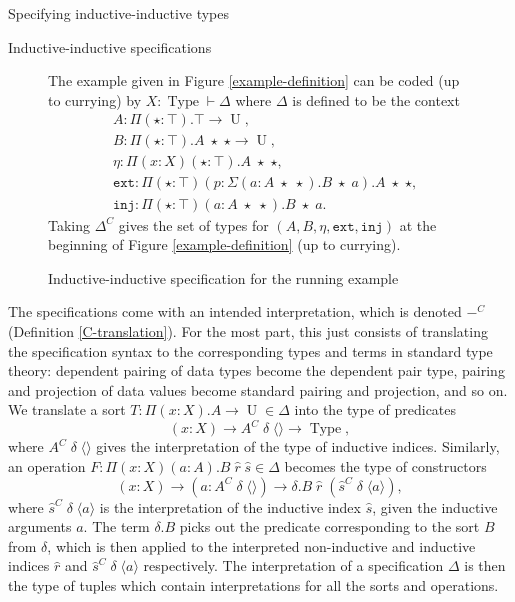 \documentclass[runningheads]{llncs}
\DeclareMathOperator{\USet}{Type}
\DeclareMathOperator{\UU}{U}
\newcommand{\tac}{\vdash}
\newcommand{\join}{\texttt{ext}}
\newcommand{\inj}{\texttt{inj}}
\def\emptytuple{\langle\rangle}
\begin{document}
{\begin{section}{Specifying inductive-inductive types}
\begin{subsection}{Inductive-inductive specifications}
\begin{figure}[htpb]\begin{flushleft}
    The example given in Figure \ref{example-definition} can be coded (up to currying) by $X : \USet \tac \Delta$ where $\Delta$ is defined to be the context \begin{align*}& A : \Pi(\star : \top).\top \to \UU,\\& B : \Pi(\star : \top).A\;\star\;\star \to \UU,\\& \eta : \Pi(x : X)(\star : \top).A\;\star\;\star, \\&\join : \Pi(\star : \top)(p : \Sigma(a : A\;\star\;\star).B\;\star\;a).A\;\star\;\star,\\& \inj : \Pi(\star : \top)(a : A\;\star\;\star).B\;\star\;a.\end{align*}
    Taking $\Delta^C$ gives the set of types for $(A, B, \eta, \join, \inj)$ at the beginning of Figure \ref{example-definition} (up to currying).
    
    \caption{\label{example-code}Inductive-inductive specification for the running example}
\end{flushleft}\end{figure}

The specifications come with an intended interpretation, which is denoted $-^C$ (Definition \ref{C-translation}).
For the most part, this just consists of translating the specification syntax to the corresponding types and terms in standard type theory: dependent pairing of data types become the dependent pair type, pairing and projection of data values become standard pairing and projection, and so on.
We translate a sort $T : \Pi(x : X).A \to \UU \in \Delta$ into the type of predicates \[(x : X) \to A^C\;\delta\;\emptytuple \to \USet,\] where $A^C\;\delta\;\emptytuple$ gives the interpretation of the type of inductive indices. Similarly, an operation $F : \Pi(x : X)(a : A).B\;\hat{r}\;\hat{s} \in \Delta$ becomes the type of constructors \[(x : X) \to (a : A^C\;\delta\;\emptytuple) \to \delta.B\;\hat{r}\;(\hat{s}^C\;\delta\;\langle a \rangle),\] where $\hat{s}^C\;\delta\;\langle a\rangle$ is the interpretation of the inductive index $\hat{s}$, given the inductive arguments $a$. The term $\delta.B$ picks out the predicate corresponding to the sort $B$ from $\delta$, which is then applied to the interpreted non-inductive and inductive indices $\hat{r}$ and $\hat{s}^C\;\delta\;\langle a \rangle$ respectively. The interpretation of a specification $\Delta$ is then the type of tuples which contain interpretations for all the sorts and operations.


\end{subsection}
\end{section}}
\end{document}
